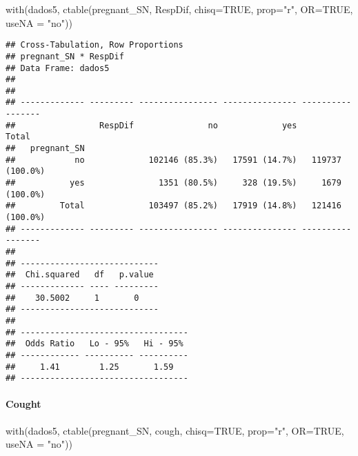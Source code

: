 \documentclass[
]{article}
\newenvironment{Shaded}{\begin{snugshade}}{\end{snugshade}}
\newcommand{\AttributeTok}[1]{\textcolor[rgb]{0.77,0.63,0.00}{#1}}
\newcommand{\ConstantTok}[1]{\textcolor[rgb]{0.00,0.00,0.00}{#1}}
\newcommand{\FunctionTok}[1]{\textcolor[rgb]{0.00,0.00,0.00}{#1}}
\newcommand{\NormalTok}[1]{#1}
\newcommand{\StringTok}[1]{\textcolor[rgb]{0.31,0.60,0.02}{#1}}
\begin{document}
\begin{Shaded}
\begin{Highlighting}[]
\FunctionTok{with}\NormalTok{(dados5, }\FunctionTok{ctable}\NormalTok{(pregnant\_SN, RespDif, }\AttributeTok{chisq=}\ConstantTok{TRUE}\NormalTok{, }\AttributeTok{prop=}\StringTok{"r"}\NormalTok{, }\AttributeTok{OR=}\ConstantTok{TRUE}\NormalTok{, }\AttributeTok{useNA =} \StringTok{"no"}\NormalTok{))}
\end{Highlighting}
\end{Shaded}

\begin{verbatim}
## Cross-Tabulation, Row Proportions  
## pregnant_SN * RespDif  
## Data Frame: dados5  
## 
## 
## ------------- --------- ---------------- --------------- -----------------
##                 RespDif               no             yes             Total
##   pregnant_SN                                                             
##            no             102146 (85.3%)   17591 (14.7%)   119737 (100.0%)
##           yes               1351 (80.5%)     328 (19.5%)     1679 (100.0%)
##         Total             103497 (85.2%)   17919 (14.8%)   121416 (100.0%)
## ------------- --------- ---------------- --------------- -----------------
## 
## ----------------------------
##  Chi.squared   df   p.value 
## ------------- ---- ---------
##    30.5002     1       0    
## ----------------------------
## 
## ----------------------------------
##  Odds Ratio   Lo - 95%   Hi - 95% 
## ------------ ---------- ----------
##     1.41        1.25       1.59   
## ----------------------------------
\end{verbatim}

\hypertarget{cought}{%
\paragraph{\texorpdfstring{{ Cought }}{ Cought }}\label{cought}}

\begin{Shaded}
\begin{Highlighting}[]
\FunctionTok{with}\NormalTok{(dados5, }\FunctionTok{ctable}\NormalTok{(pregnant\_SN, cough, }\AttributeTok{chisq=}\ConstantTok{TRUE}\NormalTok{, }\AttributeTok{prop=}\StringTok{"r"}\NormalTok{, }\AttributeTok{OR=}\ConstantTok{TRUE}\NormalTok{, }\AttributeTok{useNA =} \StringTok{"no"}\NormalTok{))}
\end{Highlighting}
\end{Shaded}
\end{document}
